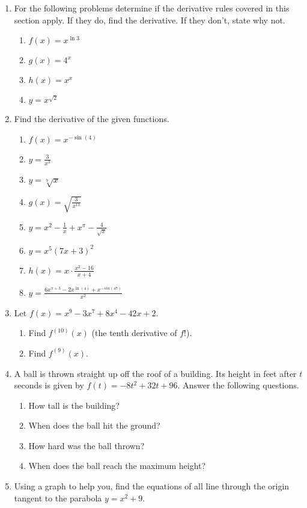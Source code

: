 \documentclass[11pt]{article}
\newcommand{\ds}{\displaystyle}
\begin{document}
\drawtitle
\begin{enumerate}
\item For the following problems determine if the derivative rules
  covered in this section apply.  If they do, find the derivative.  If
  they don't, state why not.
  \begin{enumerate}
  \item $f(x)=x^{\ln{3}}$
    \vfill
  \item $g(x)=4^x$
    \vfill
  \item $h(x)=x^x$
    \vfill
  \item $y=x^{\sqrt{2}}$
    \vfill
  \end{enumerate}
\newpage  

\item Find the derivative of the given functions.
  \begin{enumerate}
  \item $f(x)=x^{-\sin(4)}$
    \vfill
  \item $\ds y=\frac{3}{x^3}$
    \vfill
  \item $y=\sqrt[7]{x}$
    \vfill
  \item $\ds g(x)=\sqrt{\frac{3}{x^{11}}}$
    \vfill
    \newpage
  \item $\ds y=x^2-\frac{1}{x}+x^\pi-\frac{4}{\sqrt{x}}$
    \vfill
  \item $y=x^{5}(7x+3)^2$
    \vfill
  \item $\ds h(x)=x\cdot\frac{x^2-16}{x+4}$
    \vfill
  \item $\ds y=\frac{6x^{\pi+3}-2x^{\ln(4)}+x^{-sin(47)}}{x^2}$
    \vfill
  \end{enumerate}
  \newpage
  
\item Let $f(x)=x^9-3x^7+8x^4-42x+2$.
  \begin{enumerate}
  \item Find $\ds f^{(10)}(x)$ (the tenth derivative of $f$!).
    \vfill
  \item Find $\ds f^{(9)}(x)$.
    \vfill
  \end{enumerate}

\item A ball is thrown straight up off the roof of a building.  Its
  height in feet after $t$ seconds is given by
  $f(t)=-8t^2+32t+96$. Answer the following questions.
  \begin{enumerate}
  \item How tall is the building?
    \vfill
    \newpage
  \item When does the ball hit the ground?
    \vfill
  \item How hard was the ball thrown?
    \vfill
  \item When does the ball reach the maximum height?
    \vfill
  \end{enumerate}
  
  \newpage

\item Using a graph to help you, find the equations of all line
  through the origin tangent to the parabola $y = x^2 + 9$.

\end{enumerate}  
\end{document}
